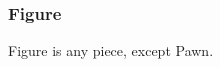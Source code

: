 \subsubsection*{Figure}
\label{sec:Classical Chess/Variants/Terms/Figure}
Figure is any piece, except Pawn.

\clearpage %
